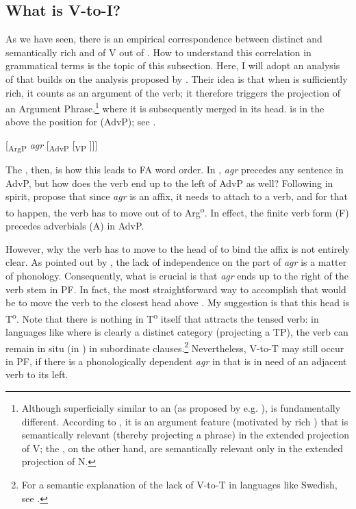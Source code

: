 \documentclass[output=paper,colorlinks,citecolor=brown,draft,draftmode]{langscibook}
\begin{document}
\subsection{What is V-to-I?}\label{sec:petzell:5.1}


As we have seen, there is an empirical correspondence between distinct and semantically rich  and  of V out of . How to understand this correlation in grammatical terms is the topic of this subsection. Here, I will adopt an analysis of  that builds on the analysis proposed by \citet{KoenemanZeijlstra2014}. Their idea is that when  is sufficiently rich, it counts as an argument of the verb; it therefore triggers the projection of an Argument Phrase,\footnote{Although superficially similar to an  (as proposed by e.g. \citealt{Chomsky1995}),  is fundamentally different. According to \citet[600]{KoenemanZeijlstra2014}, it is an argument feature (motivated by rich ) that is semantically relevant (thereby projecting a phrase) in the extended projection of V; the , on the other hand, are semantically relevant only in the extended projection of N.} where it is subsequently merged in its head.  is in the  above the position for  (AdvP); see .


\ea\label{ex:petzell:30}
[\textsubscript{ArgP} \textit{agr} [\textsubscript{AdvP} [\textsubscript{VP} ]]]\\
\z

The , then, is how this leads to FA word order. In , \textit{agr} precedes any sentence  in AdvP, but how does the verb end up to the left of AdvP as well? Following \citet{Rohrbacher1999} in spirit, \citet[601]{KoenemanZeijlstra2014} propose that since \textit{agr} is an affix, it needs to attach to a verb, and for that to happen, the verb has to move out of  to Arg\textsuperscript{o}. In effect, the finite verb form (F) precedes adverbials (A) in AdvP.



However, why the verb has to move to the head of  to bind the affix is not entirely clear. As pointed out by \citet{KoenemanZeijlstra2014}, the lack of independence on the part of \textit{agr} is a matter of phonology. Consequently, what is crucial is that \textit{agr} ends up to the right of the verb stem in PF. In fact, the most straightforward way to accomplish that would be to move the verb to the closest head above . My suggestion is that this head is T\textsuperscript{o}. Note that there is nothing in T\textsuperscript{o} itself that attracts the tensed verb: in languages like  where  is clearly a distinct category (projecting a TP), the verb can remain in situ (in ) in subordinate clauses.\footnote{For a semantic explanation of the lack of V-to-T in languages like Swedish, see \citet{Zeijlstra2012}.}  Nevertheless, V-to-T may still occur in PF, if there is a phonologically dependent \textit{agr} in  that is in need of an adjacent verb to its left.
\end{document}
